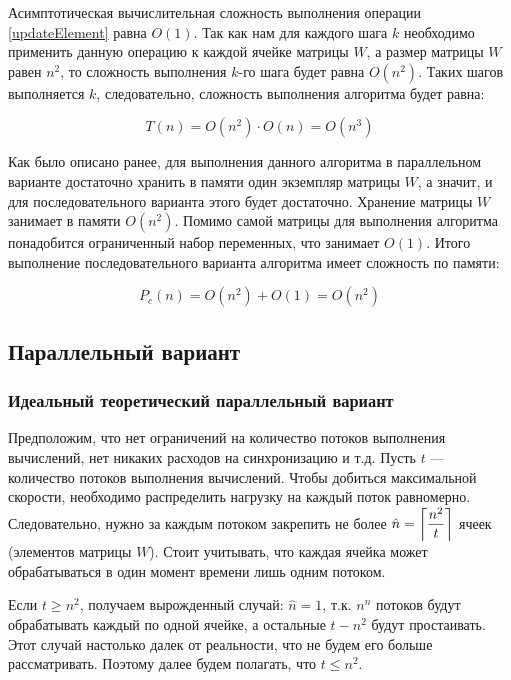 \documentclass{article}
\DeclarePairedDelimiter{\ceil}{\lceil}{\rceil}
\begin{document}
	Асимптотическая вычислительная сложность выполнения операции \ref{updateElement} равна $O(1)$. Так как нам для каждого шага $k$ необходимо применить данную операцию к каждой ячейке матрицы $W$, а размер матрицы $W$ равен $n^2$, то сложность выполнения $k$-го шага будет равна $O(n^2)$. Таких шагов выполняется $k$, следовательно, сложность выполнения алгоритма будет равна:
	
	\begin{equation} \label{consistentEquationDifficulty}
		T(n) = O(n^2)  \cdot  O(n) = O(n^3)
	\end{equation}
	
	Как было описано ранее, для выполнения данного алгоритма в параллельном варианте достаточно хранить в памяти один экземпляр матрицы $W$, а значит, и для
	последовательного варианта этого будет достаточно. Хранение матрицы $W$ занимает в памяти $O(n^2)$. Помимо самой матрицы для выполнения алгоритма понадобится ограниченный набор переменных, что занимает $O(1)$. Итого выполнение последовательного варианта алгоритма имеет сложность по памяти:
	
	\begin{equation} \label{consistentMemoryDifficulty}
		P_c(n) = O(n^2) + O(1) = O(n^2)
	\end{equation}
	
	
	\subsection{Параллельный вариант}
	
		\subsubsection{Идеальный теоретический параллельный вариант}
		
			Предположим, что нет ограничений на количество потоков выполнения вычислений, нет никаких расходов на синхронизацию и т.д. Пусть $t$ --- количество потоков выполнения вычислений. Чтобы добиться максимальной скорости, необходимо распределить нагрузку на каждый поток равномерно. Следовательно, нужно за каждым потоком закрепить не более $\hat n = \ceil*{\dfrac{n^2}{t}}$ ячеек (элементов матрицы $W$). Стоит учитывать, что каждая ячейка может обрабатываться в один момент времени лишь одним потоком.
			
			Если $t \geq n^2$, получаем вырожденный случай: $\hat n = 1$, т.к. $n^n$ потоков будут обрабатывать каждый по одной ячейке, а остальные $t-n^2$ будут простаивать. Этот случай настолько далек от реальности, что не будем его больше рассматривать. Поэтому далее будем полагать, что $t \leq n^2$.
			
\end{document}
